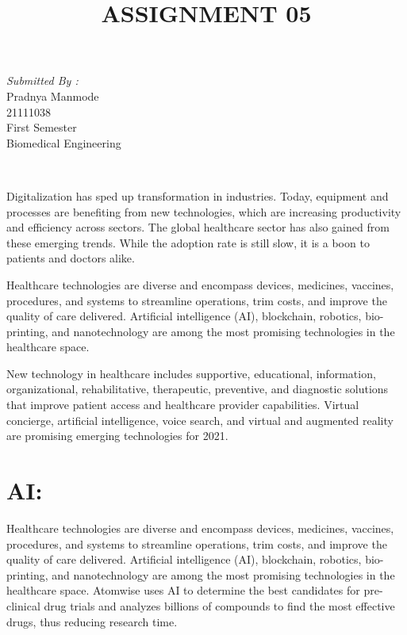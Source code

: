 \documentclass[12pt]{article}
\begin{document}
\begin{titlepage}
\begin{minipage}{0.4\textwidth}
			\begin{flushright} \large
			\emph{Submitted By :} \\
			Pradnya Manmode\\
            21111038\\
        First Semester\\
        Biomedical Engineering\\
		\end{flushright}
        
	\end{minipage}\\[2 cm]
	
	
    
    
    
    
	
\end{titlepage}


\title{ASSIGNMENT 05}
\maketitle

\indent
Digitalization has sped up transformation in industries. Today, equipment and processes are benefiting from new technologies, which are increasing productivity and efficiency across sectors. The global healthcare sector has also gained from these emerging trends. While the adoption rate is still slow, it is a boon to patients and doctors alike.

Healthcare technologies are diverse and encompass devices, medicines, vaccines, procedures, and systems to streamline operations, trim costs, and improve the quality of care delivered. Artificial intelligence (AI), blockchain, robotics, bio-printing, and nanotechnology are among the most promising technologies in the healthcare space.

New technology in healthcare includes supportive, educational, information, organizational, rehabilitative, therapeutic, preventive, and diagnostic solutions that improve patient access and healthcare provider capabilities. Virtual concierge, artificial intelligence, voice search, and virtual and augmented reality are promising emerging technologies for 2021.

\section{AI:}
Healthcare technologies are diverse and encompass devices, medicines, vaccines, procedures, and systems to streamline operations, trim costs, and improve the quality of care delivered. Artificial intelligence (AI), blockchain, robotics, bio-printing, and nanotechnology are among the most promising technologies in the healthcare space.
Atomwise uses AI to determine the best candidates for pre-clinical drug trials and analyzes billions of compounds to find the most effective drugs, thus reducing research time.
\end{document}
